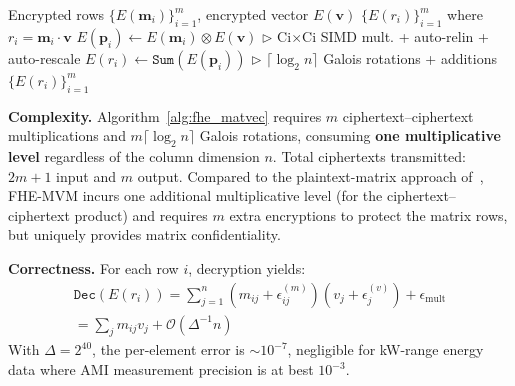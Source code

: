 \documentclass[conference]{IEEEtran}
\begin{document}
\begin{algorithm}[!t]
\caption{FHE-MVM: Fully Homomorphic Matrix--Vector Multiply}
\label{alg:fhe_matvec}
\small
\begin{algorithmic}[1]
\REQUIRE Encrypted rows $\{E(\mathbf{m}_i)\}_{i=1}^m$, encrypted vector $E(\mathbf{v})$
\ENSURE $\{E(r_i)\}_{i=1}^m$ where $r_i = \mathbf{m}_i \cdot \mathbf{v}$
    \STATE $E(\mathbf{p}_i) \leftarrow E(\mathbf{m}_i) \otimes E(\mathbf{v})$ \hfill $\triangleright$ Ci$\times$Ci SIMD mult. + auto-relin + auto-rescale
    \STATE $E(r_i) \leftarrow \texttt{Sum}(E(\mathbf{p}_i))$ \hfill $\triangleright$ $\lceil\log_2 n\rceil$ Galois rotations + additions
\ENDFOR
\RETURN $\{E(r_i)\}_{i=1}^m$
\end{algorithmic}
\end{algorithm}

\textbf{Complexity.} Algorithm~\ref{alg:fhe_matvec} requires $m$ ciphertext--ciphertext multiplications and $m\lceil\log_2 n\rceil$ Galois rotations, consuming \textbf{one multiplicative level} regardless of the column dimension $n$. Total ciphertexts transmitted: $2m{+}1$ input and $m$ output. Compared to the plaintext-matrix approach of~\cite{Halevi2014}, FHE-MVM incurs one additional multiplicative level (for the ciphertext--ciphertext product) and requires $m$ extra encryptions to protect the matrix rows, but uniquely provides matrix confidentiality.

\textbf{Correctness.} For each row $i$, decryption yields:
\begin{multline}
    \texttt{Dec}(E(r_i)) = \sum_{j=1}^n \!\left(m_{ij}+\epsilon_{ij}^{(m)}\right)\!\left(v_j+\epsilon_j^{(v)}\right) + \epsilon_\text{mult} \\
    = \textstyle\sum_j m_{ij}v_j + \mathcal{O}(\Delta^{-1}n)
\end{multline}
With $\Delta=2^{40}$, the per-element error is ${\sim}10^{-7}$, negligible for kW-range energy data where AMI measurement precision is at best $10^{-3}$.
\end{document}
